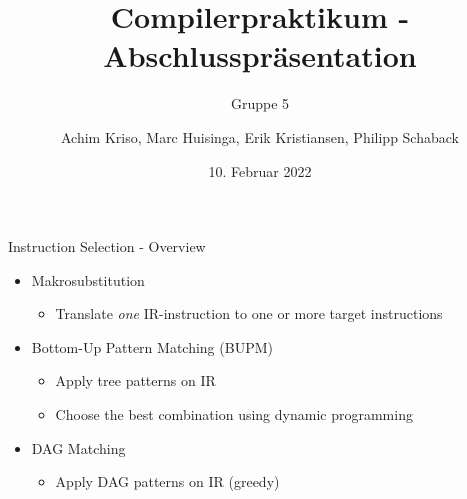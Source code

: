 \documentclass[en,16:9]{sdqbeamer}
\title[]{Compilerpraktikum - Abschlusspräsentation}
\subtitle{Gruppe 5}
\author[]{Achim Kriso, Marc Huisinga, Erik Kristiansen, Philipp Schaback}
\date[10.\,2.\,2022]{10. Februar 2022}
\begin{document}
\KITtitleframe

\begin{frame}{Instruction Selection - Overview}
	\begin{itemize}
		\item Makrosubstitution
		\begin{itemize}
			\item Translate \emph{one} IR-instruction to one or more target instructions
		\end{itemize}
		\vspace{1em}
		\item Bottom-Up Pattern Matching (BUPM)
		\begin{itemize}
			\item Apply tree patterns on IR
			\item Choose the best combination using dynamic programming
		\end{itemize}
		\vspace{1em}
		\item DAG Matching
		\begin{itemize}
			\item Apply DAG patterns on IR (greedy)
		\end{itemize}
	\end{itemize}
\end{frame}
\end{document}
